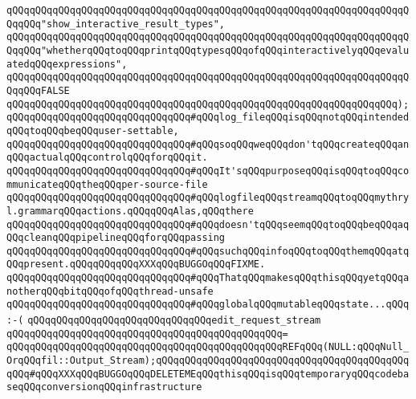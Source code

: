 \verb|qQQqqQQqqQQqqQQqqQQqqQQqqQQqqQQqqQQqqQQqqQQqqQQqqQQqqQQqqQQqqQQqqQQqqQQqqQQq"show_interactive_result_types",|\newline
\verb|qQQqqQQqqQQqqQQqqQQqqQQqqQQqqQQqqQQqqQQqqQQqqQQqqQQqqQQqqQQqqQQqqQQqqQQqqQQq"whetherqQQqtoqQQqprintqQQqtypesqQQqofqQQqinteractivelyqQQqevaluatedqQQqexpressions",|\newline
\verb|qQQqqQQqqQQqqQQqqQQqqQQqqQQqqQQqqQQqqQQqqQQqqQQqqQQqqQQqqQQqqQQqqQQqqQQqqQQqFALSE|\newline
\verb|qQQqqQQqqQQqqQQqqQQqqQQqqQQqqQQqqQQqqQQqqQQqqQQqqQQqqQQqqQQqqQQqqQQq);|\newline
\newline
\newline
\verb|qQQqqQQqqQQqqQQqqQQqqQQqqQQqqQQq#qQQqlog_fileqQQqisqQQqnotqQQqintendedqQQqtoqQQqbeqQQquser-settable,|\newline
\verb|qQQqqQQqqQQqqQQqqQQqqQQqqQQqqQQq#qQQqsoqQQqweqQQqdon'tqQQqcreateqQQqanqQQqactualqQQqcontrolqQQqforqQQqit.|\newline
\verb|qQQqqQQqqQQqqQQqqQQqqQQqqQQqqQQq#qQQqIt'sqQQqpurposeqQQqisqQQqtoqQQqcommunicateqQQqtheqQQqper-source-file|\newline
\verb|qQQqqQQqqQQqqQQqqQQqqQQqqQQqqQQq#qQQqlogfileqQQqstreamqQQqtoqQQqmythryl.grammarqQQqactions.qQQqqQQqAlas,qQQqthere|\newline
\verb|qQQqqQQqqQQqqQQqqQQqqQQqqQQqqQQq#qQQqdoesn'tqQQqseemqQQqtoqQQqbeqQQqaqQQqcleanqQQqpipelineqQQqforqQQqpassing|\newline
\verb|qQQqqQQqqQQqqQQqqQQqqQQqqQQqqQQq#qQQqsuchqQQqinfoqQQqtoqQQqthemqQQqatqQQqpresent.qQQqqQQqqQQqXXXqQQqBUGGOqQQqFIXME.|\newline
\verb|qQQqqQQqqQQqqQQqqQQqqQQqqQQqqQQq#qQQqThatqQQqmakesqQQqthisqQQqyetqQQqanotherqQQqbitqQQqofqQQqthread-unsafe|\newline
\verb|qQQqqQQqqQQqqQQqqQQqqQQqqQQqqQQq#qQQqglobalqQQqmutableqQQqstate...qQQq:-(|\newline
\newline
\verb|qQQqqQQqqQQqqQQqqQQqqQQqqQQqqQQqedit_request_stream|\newline
\verb|qQQqqQQqqQQqqQQqqQQqqQQqqQQqqQQqqQQqqQQqqQQqqQQq=|\newline
\verb|qQQqqQQqqQQqqQQqqQQqqQQqqQQqqQQqqQQqqQQqqQQqqQQqREFqQQq(NULL:qQQqNull_OrqQQqfil::Output_Stream);qQQqqQQqqQQqqQQqqQQqqQQqqQQqqQQqqQQqqQQqqQQqqQQq#qQQqXXXqQQqBUGGOqQQqDELETEMEqQQqthisqQQqisqQQqtemporaryqQQqcodebaseqQQqconversionqQQqinfrastructure|\newline
\newline
